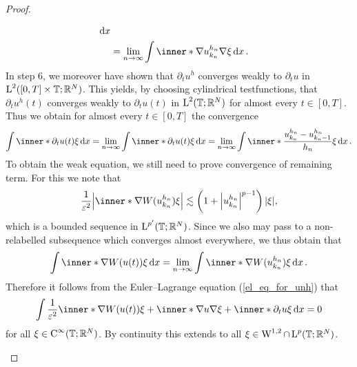 \begin{proof}
\begin{description}[wide=0pt]
\begin{align*}
			\dd{x }
			\\
			& = 
			\lim_{ n \to \infty }
			\int
			\inner*{ \nabla u_{ k_{ n } }^{ h_{ n } } }{ \nabla \xi }
			\dd{ x }.
		\end{align*}
		In step 6, we moreover have shown that $ \partial_{ t } u^{ h } $ converges weakly to $ \partial_{t } u $ in $ \operatorname{L}^{ 2 } ( [ 0, T ] \times \operatorname{\mathbb{T}} ; \mathbb{ R }^{ N } ) $. This yields, by choosing cylindrical testfunctions, that $ \partial_{ t } u^{ h } ( t ) $ converges weakly to $ \partial_{ t } u ( t ) $ in $ \operatorname{L}^{ 2 } ( \operatorname{\mathbb{T}} ; \mathbb{ R }^{ N } ) $ for almost every $ t \in [ 0 , T ] $.
		Thus we obtain for almost every $ t\in [ 0 , T ] $ the convergence
		\begin{equation*}
			\int
			\inner*{ \partial_{ t } u ( t ) }{ \xi }
			\dd{ x }
			=
			\lim_{ n \to \infty }
			\int
			\inner*{ \partial_{ t } u ( t ) }{ \xi }
			\dd{ x }
			=
			\lim_{ n \to \infty }
			\int
			\inner*{ \frac{ u_{ k_{ n } }^{ h_{ n } } - u_{ k_{ n } - 1 }^{ h_{ n } } }{ h_{ n } } }{ \xi }
			\dd{ x }.
		\end{equation*}
		To obtain the weak equation, we still need to prove convergence of remaining term. For this we note that 
		\begin{equation*}
			\frac{ 1 }{ \varepsilon^{ 2 } }
			\abs{ \inner*{ \nabla W ( u_{ k_{ n } }^{ h_{ n } } ) }{ \xi } }
			\lesssim
			\left( 1 + \abs{ u_{  k_{ n } }^{ h_{ n } } }^{ p - 1 } \right) \abs{ \xi },
		\end{equation*}
		which is a bounded sequence in $ \operatorname{L}^{ p'} ( \operatorname{\mathbb{T}} ; \mathbb{ R }^{ N } ) $. Since we also may pass to a non-relabelled subsequence which converges almost everywhere, we thus obtain that
		\begin{equation*}
			\int
			\inner*{ \nabla W ( u ( t ) ) }{ \xi } 
			\dd{ x }
			=
			\lim_{ n \to \infty }
			\int
			\inner*{ \nabla W ( u_{ k_{ n } }^{ h_{ n } } ) }{ \xi }
			\dd{ x }.
		\end{equation*}
		Therefore it follows from the Euler--Lagrange equation (\ref{el_eq_for_unh}) that
		\begin{equation*}
			\int
			\frac{ 1 }{ \varepsilon^{ 2 } }
			\inner*{ \nabla W ( u ( t )) }{ \xi }
			+
			\inner*{ \nabla u }{ \nabla \xi }
			+
			\inner*{ \partial_{ t } u }{ \xi }
			\dd{ x }
			=
			0
		\end{equation*}
		for all $ \xi \in \operatorname{C}^{ \infty } ( \operatorname{\mathbb{T}} ; \mathbb{ R }^{ N } ) $. By continuity this extends to all $ \xi \in \operatorname{W}^{ 1 , 2 } \cap \operatorname{L}^{ p } ( \mathbb{ T } ; \mathbb{ R }^{ N } ) $.
		

\end{description}
\end{proof}
